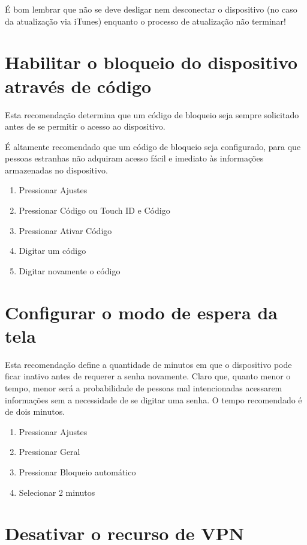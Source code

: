 \'E bom lembrar que n\~ao se deve desligar nem desconectar o dispositivo (no caso da atualiza\c c\~ao via iTunes) enquanto o processo de atualiza\c c\~ao n\~ao terminar!

\section{Habilitar o bloqueio do dispositivo atrav\'es de c\'odigo}

Esta recomenda\c c\~ao determina que um c\'odigo de bloqueio seja sempre solicitado antes de se permitir o acesso ao dispositivo. 

\'E altamente recomendado que um c\'odigo de bloqueio seja configurado, para que pessoas estranhas n\~ao adquiram acesso f\'acil e imediato \`as informa\c c\~oes armazenadas no dispositivo. 

\begin{enumerate}
\item Pressionar Ajustes
\item Pressionar C\'odigo ou Touch ID e C\'odigo
\item Pressionar Ativar C\'odigo
\item Digitar um c\'odigo
\item Digitar novamente o c\'odigo
\end{enumerate}

\section{Configurar o modo de espera da tela}

Esta recomenda\c c\~ao define a quantidade de minutos em que o dispositivo pode ficar inativo antes de requerer a senha novamente. Claro que, quanto menor o tempo, menor ser\'a a probabilidade de pessoas mal intencionadas acessarem informa\c c\~oes sem a necessidade de se digitar uma senha. O tempo recomendado \'e de dois minutos.

\begin{enumerate}
\item Pressionar Ajustes
\item Pressionar Geral
\item Pressionar Bloqueio autom\'atico
\item Selecionar 2 minutos
\end{enumerate}

\section{Desativar o recurso de VPN} 

